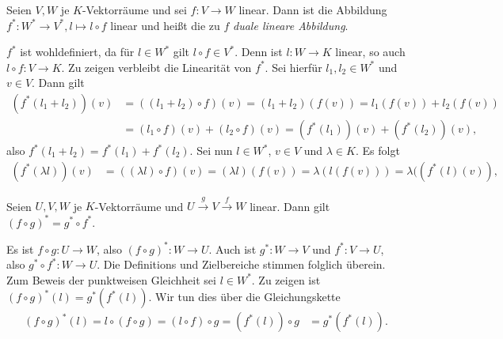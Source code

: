 \documentclass[../../main.tex]{subfiles}
\begin{document}
\begin{propdef}\label{13.1.8}
Seien $V,W$ je $K$-Vektorräume und sei $f: V\to W$ linear. Dann ist die Abbildung $f^*: W^*\to V^*, l\mapsto l\circ f$ linear und heißt die zu $f$ \emph{duale lineare Abbildung}.
\end{propdef}
\begin{cproof}
$f^*$ ist wohldefiniert, da für $l\in W^*$ gilt $l\circ f\in V^*$. Denn ist $l: W\to K$ linear, so auch $l\circ f: V\to K$. Zu zeigen verbleibt die Linearität von $f^*$. Sei hierfür $l_1,l_2\in W^*$ und $v\in V$. Dann gilt
\begin{align*}
(f^*(l_1+l_2))(v)&=((l_1+l_2)\circ f)(v)=(l_1+l_2)(f(v))=l_1(f(v))+l_2(f(v))\\
&=(l_1\circ f)(v)+(l_2\circ f)(v)=(f^*(l_1))(v)+(f^*(l_2))(v),
\end{align*}
also $f^*(l_1+l_2)=f^*(l_1)+f^*(l_2)$.	Sei nun $l\in W^*$, $v\in V$ und $\lambda\in K$. Es folgt
\begin{align*}
(f^*(\lambda l))(v)&=((\lambda l)\circ f)(v)=(\lambda l)(f(v))=\lambda(l(f(v)))=\lambda((f^*(l)(v)),
\end{align*}
\end{cproof}
	
\begin{pro}\label{13.1.9}
Seien $U,V,W$ je $K$-Vektorräume und $U\stackrel{g}{\to}V\stackrel{f}{\to}W$ linear. Dann gilt $(f\circ g)^*=g^*\circ f^*$.
\end{pro}
\begin{cproof}
Es ist $f\circ g: U\to W$, also $(f\circ g)^*: W\to U$. Auch ist $g^*: W\to V$ und $f^*: V\to U$, also $g^*\circ f^*: W\to U$. Die Definitions und Zielbereiche stimmen folglich überein. Zum Beweis der punktweisen Gleichheit sei $l\in W^*$. Zu zeigen ist $(f\circ g)^*(l)=g^*(f^*(l))$. Wir tun dies über die Gleichungskette
\begin{align*}
(f\circ g)^*(l)=l\circ (f\circ g)=(l\circ f)\circ g=(f^*(l))\circ g
&=g^*(f^*(l)).
\end{align*}
\end{cproof}
\end{document}
